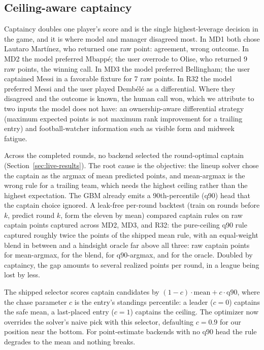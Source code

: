 \subsection{Ceiling-aware captaincy}
\label{sec:analysis-captaincy}

Captaincy doubles one player's score and is the single highest-leverage
decision in the game, and it is where model and manager disagreed most.
In MD1 both chose Lautaro Mart\'inez, who returned one raw point:
agreement, wrong outcome. In MD2 the model preferred Mbapp\'e; the user
overrode to Olise, who returned 9 raw points, the winning call. In MD3
the model preferred Bellingham; the user captained Messi in a favorable
fixture for 7 raw points. In R32 the model preferred Messi and the user
played Demb\'el\'e as a differential. Where they disagreed and the
outcome is known, the human call won, which we attribute to two inputs
the model does not have: an ownership-aware differential strategy
(maximum expected points is not maximum rank improvement for a trailing
entry) and football-watcher information such as visible form and
midweek fatigue.

Across the completed rounds, no backend selected the round-optimal
captain (Section~\ref{sec:live-results}). The root cause is the
objective: the lineup solver chose the captain as the argmax of mean
predicted points, and mean-argmax is the wrong rule for a trailing
team, which needs the highest ceiling rather than the highest
expectation. The GBM already emits a 90th-percentile (q90) head that
the captain choice ignored. A leak-free per-round backtest (train on
rounds before $k$, predict round $k$, form the eleven by mean) compared
captain rules on raw captain points captured across MD2, MD3, and R32:
the pure-ceiling q90 rule captured roughly twice the points of the
shipped mean rule, with an equal-weight blend in between and a
hindsight oracle far above all three: \CaptainMeanPts{} raw captain
points for mean-argmax, \CaptainBlendPts{} for the blend,
\CaptainCeilingPts{} for q90-argmax, and \CaptainOraclePts{} for the
oracle. Doubled by captaincy, the gap
amounts to several realized points per round, in a league being lost by
less.

The shipped selector scores captain candidates by
$(1 - c) \cdot \text{mean} + c \cdot \text{q90}$, where the chase
parameter $c$ is the entry's standings percentile: a leader ($c = 0$)
captains the safe mean, a last-placed entry ($c = 1$) captains the
ceiling. The optimizer now overrides the solver's naive pick with this
selector, defaulting $c = 0.9$ for our position near the bottom. For
point-estimate backends with no q90 head the rule degrades to the mean
and nothing breaks.

